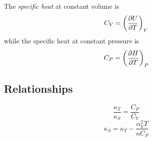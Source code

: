 The {\it specific heat} at constant volume is
\begin{equation}
  C_V=\left(\pdv{U}{T}\right)_{V}
\end{equation}
while the specific heat at constant pressure is
\begin{equation}
  C_P=\left(\pdv{H}{T}\right)_{P}
\end{equation}

\subsection{Relationships}

\begin{equation}
 \frac{\kappa_T}{\kappa_S}=\frac{C_P}{C_V}
\end{equation}
\begin{equation}
 \kappa_S=\kappa_T-\frac{\alpha_V^2 T}{n C_P}
\end{equation}




